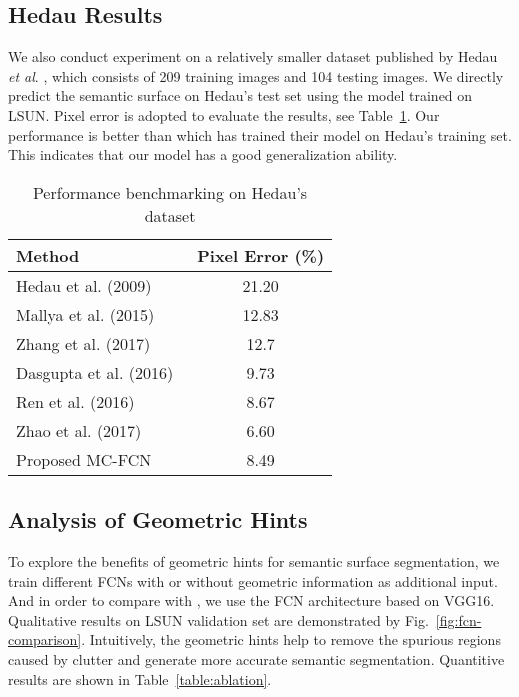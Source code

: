 \subsection{Hedau Results}
\label{sec:Hedau}
We also conduct experiment on a relatively smaller dataset published by Hedau \emph{et al}. \cite{hedau2009recovering}, which consists of 209 training images and 104 testing images. We directly predict the semantic surface on Hedau's test set using the model trained on LSUN. Pixel error is adopted to evaluate the results, see Table~\ref{table:comparison-hedau}. Our performance is better than \cite{ren2016three} which has trained their model on Hedau's training set. This indicates that our model has a good generalization ability.

\begin{table}
	\centering 
	\caption{Performance benchmarking on Hedau's dataset}
	\label{table:comparison-hedau}
	\begin{tabular}{l|c}
		\hline 
		Method & Pixel Error (\%) \\
		\hline
		Hedau et al. (2009)~\cite{hedau2009recovering} & 21.20 \\
		Mallya et al. (2015)~\cite{mallya2015learning} & 12.83 \\
		Zhang et al. (2017)~\cite{zhang2017learning} & 12.7 \\
		Dasgupta et al. (2016)~\cite{dasgupta2016delay} & 9.73 \\
		Ren et al. (2016)~\cite{ren2016three} & 8.67 \\
		Zhao et al. (2017)~\cite{zhao2017physics} & 6.60 \\
		Proposed MC-FCN & 8.49 \\
		\hline
	\end{tabular}
\end{table}


\subsection{Analysis of Geometric Hints}
\label{sec:ablation}
To explore the benefits of geometric hints for semantic surface segmentation, we train different FCNs with or without geometric information as additional input. And in order to compare with \cite{ren2016coarse}, we use the FCN architecture based on VGG16. Qualitative results on LSUN validation set are demonstrated by Fig.~\ref{fig:fcn-comparison}. Intuitively, the geometric hints help to remove the spurious regions caused by clutter and generate more accurate semantic segmentation. Quantitive results are shown in Table~\ref{table:ablation}. 

